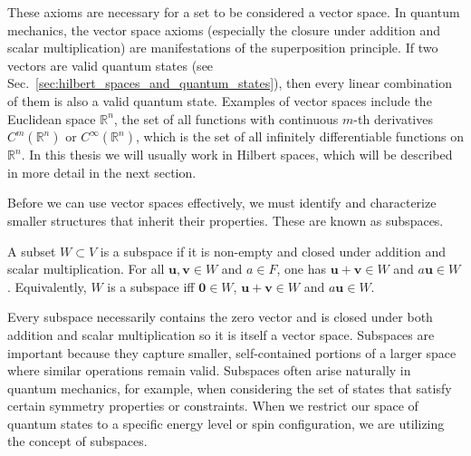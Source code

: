 These axioms are necessary for a set to be considered a vector space. In quantum mechanics, the vector space axioms (especially the closure under addition and scalar multiplication) are manifestations of the superposition principle.\supercite{1156991840} If two vectors are valid quantum states (see Sec.~\ref{sec:hilbert_spaces_and_quantum_states}), then every linear combination of them is also a valid quantum state. Examples of vector spaces include the Euclidean space $\mathbb{R}^n$, the set of all functions with continuous $m$-th derivatives $C^m(\mathbb{R}^n)$ or $C^\infty(\mathbb{R}^n)$, which is the set of all infinitely differentiable functions on $\mathbb{R}^n$. In this thesis we will usually work in Hilbert spaces, which will be described in more detail in the next section.

Before we can use vector spaces effectively, we must identify and characterize smaller structures that inherit their properties. These are known as subspaces.
\begin{definition}[Subspace]
A subset $W\subset V$ is a subspace if it is non-empty and closed under addition and scalar multiplication. For all $\symbf{u},\symbf{v}\in W$ and $a\in F$, one has $\symbf{u}+\symbf{v}\in W$ and $a\symbf{u}\in W$. Equivalently, $W$ is a subspace iff $\symbf{0}\in W$, $\symbf{u}+\symbf{v}\in W$ and $a\symbf{u}\in W$.
\end{definition}
Every subspace necessarily contains the zero vector and is closed under both addition and scalar multiplication so it is itself a vector space. Subspaces are important because they capture smaller, self-contained portions of a larger space where similar operations remain valid. Subspaces often arise naturally in quantum mechanics, for example, when considering the set of states that satisfy certain symmetry properties or constraints. When we restrict our space of quantum states to a specific energy level or spin configuration, we are utilizing the concept of subspaces.

